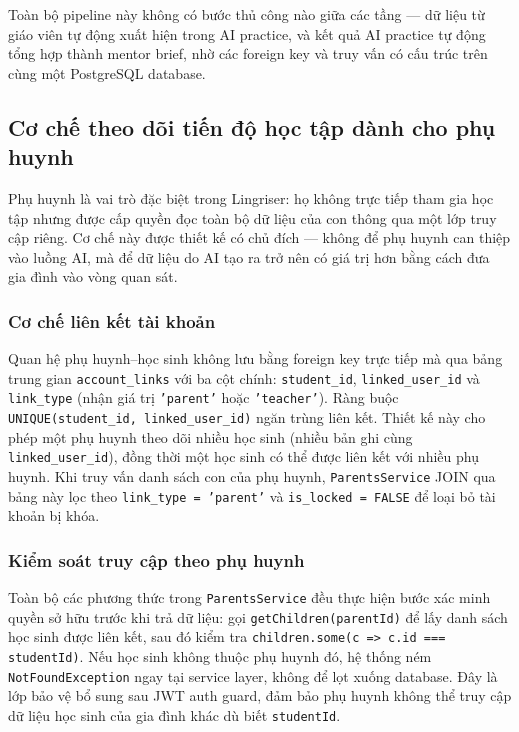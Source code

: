 Toàn bộ pipeline này không có bước thủ công nào giữa các tầng — dữ liệu từ giáo viên tự động xuất hiện trong AI practice, và kết quả AI practice tự động tổng hợp thành mentor brief, nhờ các foreign key và truy vấn có cấu trúc trên cùng một PostgreSQL database.

\subsection{Cơ chế theo dõi tiến độ học tập dành cho phụ huynh}

Phụ huynh là vai trò đặc biệt trong Lingriser: họ không trực tiếp tham gia học tập nhưng được cấp quyền đọc toàn bộ dữ liệu của con thông qua một lớp truy cập riêng. Cơ chế này được thiết kế có chủ đích — không để phụ huynh can thiệp vào luồng AI, mà để dữ liệu do AI tạo ra trở nên có giá trị hơn bằng cách đưa gia đình vào vòng quan sát.

\subsubsection{Cơ chế liên kết tài khoản}

Quan hệ phụ huynh--học sinh không lưu bằng foreign key trực tiếp mà qua bảng trung gian \texttt{account\_links} với ba cột chính: \texttt{student\_id}, \texttt{linked\_user\_id} và \texttt{link\_type} (nhận giá trị \texttt{'parent'} hoặc \texttt{'teacher'}). Ràng buộc \texttt{UNIQUE(student\_id, linked\_user\_id)} ngăn trùng liên kết. Thiết kế này cho phép một phụ huynh theo dõi nhiều học sinh (nhiều bản ghi cùng \texttt{linked\_user\_id}), đồng thời một học sinh có thể được liên kết với nhiều phụ huynh. Khi truy vấn danh sách con của phụ huynh, \texttt{ParentsService} JOIN qua bảng này lọc theo \texttt{link\_type = 'parent'} và \texttt{is\_locked = FALSE} để loại bỏ tài khoản bị khóa.

\subsubsection{Kiểm soát truy cập theo phụ huynh}

Toàn bộ các phương thức trong \texttt{ParentsService} đều thực hiện bước xác minh quyền sở hữu trước khi trả dữ liệu: gọi \texttt{getChildren(parentId)} để lấy danh sách học sinh được liên kết, sau đó kiểm tra \texttt{children.some(c => c.id === studentId)}. Nếu học sinh không thuộc phụ huynh đó, hệ thống ném \texttt{NotFoundException} ngay tại service layer, không để lọt xuống database. Đây là lớp bảo vệ bổ sung sau JWT auth guard, đảm bảo phụ huynh không thể truy cập dữ liệu học sinh của gia đình khác dù biết \texttt{studentId}.

